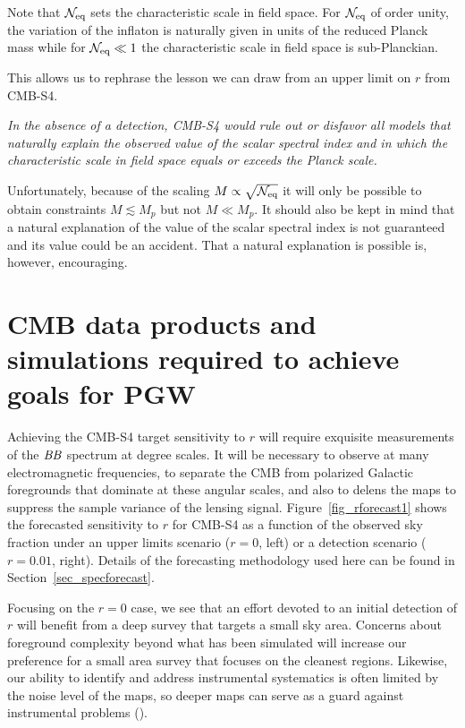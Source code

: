 Note that $\mathcal{N}_{\rm eq}$ sets the characteristic scale in field space. For $\mathcal{N}_{\rm eq}$ of order unity, the variation of the inflaton is naturally given in units of the reduced Planck mass while for $\mathcal{N}_{\rm eq}\ll 1$ the characteristic scale in field space is sub-Planckian. 

This allows us to rephrase the lesson we can draw from an upper limit on $r$ from CMB-S4.

{\em In the absence of a detection, CMB-S4 would rule out or disfavor all models that naturally explain the observed value of the scalar spectral index and in which the characteristic scale in field space equals or exceeds the Planck scale.}

Unfortunately, because of the scaling $M\propto \sqrt{\mathcal{N}_{\rm eq}}$ it will only be possible to obtain constraints $M\lesssim M_p$ but not $M\ll M_p$. It should also be kept in mind that a natural explanation of the value of the scalar spectral index is not guaranteed and its value could be an accident. That a natural explanation is possible is, however, encouraging.

\section{CMB data products and simulations required to achieve goals for PGW}
\label{sec:needs}

Achieving the CMB-S4 target sensitivity to $r$ will require exquisite measurements of the $\mathit{BB}$ spectrum at degree scales.
It will be necessary to observe at many electromagnetic frequencies, to separate the CMB from polarized Galactic foregrounds that dominate at these angular scales, and also to delens the maps to suppress the sample variance of the lensing signal.
Figure~\ref{fig_rforecast1} shows the forecasted sensitivity to $r$ for CMB-S4 as a function of the observed sky fraction under an upper limits scenario ($r=0$, left) or a detection scenario ($r=0.01$, right).
Details of the forecasting methodology used here can be found in Section~\ref{sec_specforecast}.

Focusing on the $r=0$ case, we see that an effort devoted to an initial detection of $r$ will benefit from a deep survey that targets a small sky area.
Concerns about foreground complexity beyond what has been simulated will increase our preference for a small area survey that focuses on the cleanest regions.
Likewise, our ability to identify and address instrumental systematics is often limited by the noise level of the maps, so deeper maps can serve as a guard against instrumental problems ().

